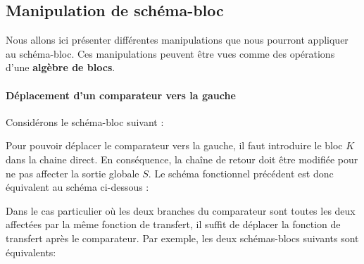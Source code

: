 \subsection{Manipulation de schéma-bloc}
Nous allons ici présenter différentes manipulations que nous
pourront appliquer au schéma-bloc. Ces manipulations peuvent
être vues comme des opérations d'une \textbf{algèbre de blocs}.
\paragraph{Déplacement d'un comparateur vers la gauche}
Considérons le schéma-bloc suivant :
\begin{center}
    
\end{center}
Pour pouvoir déplacer le comparateur vers la gauche, 
il faut introduire le bloc $K$ dans la chaine direct.
En conséquence, la chaîne de retour doit être modifiée pour ne pas affecter 
la sortie globale $S$. Le schéma fonctionnel précédent est donc équivalent 
au schéma ci-dessous :
\begin{center}
    
\end{center}
Dans le cas particulier où les deux branches du comparateur sont toutes 
les deux affectées par la même fonction de transfert, il suffit de déplacer 
la fonction de transfert après le comparateur. Par exemple, les deux 
schémas-blocs suivants sont équivalents: 
\begin{center}
    
\end{center}
